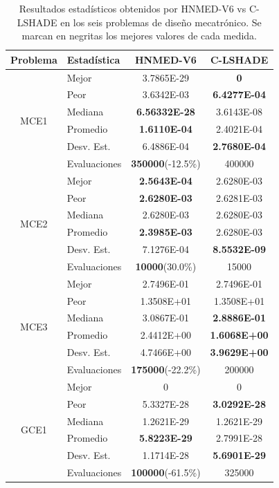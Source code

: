\begin{table}
	\centering
	\caption[Resultados estadísticos obtenidos por HNMED-V6 vs C-LSHADE
	en los seis problemas de diseño mecatrónico]{Resultados estadísticos obtenidos por HNMED-V6 vs C-LSHADE
		en los seis problemas de diseño mecatrónico. Se marcan en negritas los
		mejores valores de cada medida.} \label{tab:Resultados estadísticos obtenidos por variantes HNMED6 y CLSHADE  en experimento E.}
	\begin{tabular}{clcc} 
		\hline
		Problema              & Estadística   & HNMED-V6 & C-LSHADE  \\ 
		\hline
		\multirow{6}{*}{MCE1} & Mejor        & 3.7865E-29 &\textbf{ 0 }            \\
		& Peor         &3.6342E-03&  \textbf{6.4277E-04}
		\\
		& Mediana      &\textbf{6.56332E-28}&3.6143E-08            \\
		& Promedio     &\textbf{1.6110E-04}&  2.4021E-04             \\
		& Desv. Est.   &6.4886E-04& \textbf{2.7680E-04 }         \\
		& Evaluaciones &\textbf{350000}(-12.5\%)  &  400000       \\
		\hline
		
		\multirow{6}{*}{MCE2} & Mejor        &\textbf{2.5643E-04}&2.6280E-03
		\\
		& Peor         &\textbf{2.6280E-03}&2.6281E-03                \\
		& Mediana      &2.6280E-03&2.6280E-03   \\
		& Promedio     &\textbf{2.3985E-03}&2.6280E-03    \\
		& Desv. Est.   &7.1276E-04&\textbf{8.5532E-09} \\
		& Evaluaciones &\textbf{10000}(30.0\%) &15000                \\
		\hline
		
		\multirow{6}{*}{MCE3} & Mejor        &2.7496E-01&2.7496E-01  \\
		& Peor         &1.3508E+01&1.3508E+01     \\
		& Mediana      &3.0867E-01&\textbf{2.8886E-01} \\
		& Promedio     &2.4412E+00&\textbf{1.6068E+00}\\
		& Desv. Est.   &4.7466E+00&\textbf{3.9629E+00}\\
		& Evaluaciones &\textbf{175000}(-22.2\%)& 200000 \\
		\hline
		\multirow{6}{*}{GCE1} & Mejor        &0&0\\
		& Peor         &5.3327E-28&\textbf{3.0292E-28}\\
		& Mediana      &1.2621E-29&1.2621E-29\\
		& Promedio     &\textbf{5.8223E-29}&2.7991E-28 \\
		& Desv. Est.   &1.1714E-28&\textbf{5.6901E-29}\\
		& Evaluaciones &\textbf{100000}(-61.5\%)&325000 \\
		\hline
		

\end{tabular}
\end{table}
